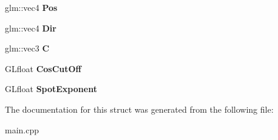 \begin{DoxyCompactItemize}
glm\+::vec4 {\bfseries Pos}
\item 
\mbox{\label{struct_light_params_af3eff9a35c7e1d5606a82bccc1bfeeec}} 
glm\+::vec4 {\bfseries Dir}
\item 
\mbox{\label{struct_light_params_ab5f4306c4f1c855a4b34b55a91efc8cf}} 
glm\+::vec3 {\bfseries C}
\item 
\mbox{\label{struct_light_params_aff1247010ed10eb06ff787bfc275dc4b}} 
G\+Lfloat {\bfseries Cos\+Cut\+Off}
\item 
\mbox{\label{struct_light_params_a29a0354e2f5b4571b6ced4ff281e53c8}} 
G\+Lfloat {\bfseries Spot\+Exponent}
\end{DoxyCompactItemize}


The documentation for this struct was generated from the following file\+:\begin{DoxyCompactItemize}
\item 
main.\+cpp\end{DoxyCompactItemize}
